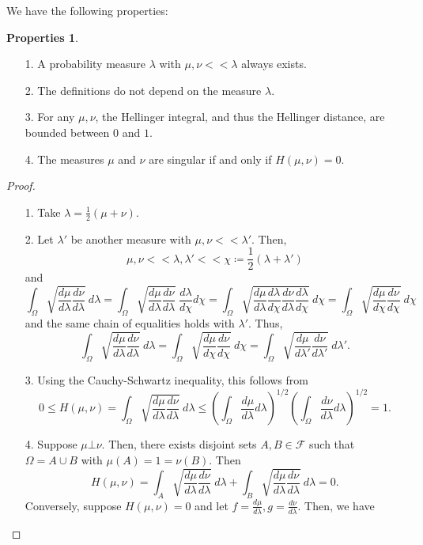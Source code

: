 \documentclass[10pt, a4paper]{report}
\theoremstyle{definition}
\newtheorem*{properties*}{Properties}
\theoremstyle{remark}
\begin{document}
We have the following properties:
\begin{properties*}
	\begin{itemize}
		\item[] 
		\item[1.] A probability measure $\lambda$ with $\mu,\nu << \lambda$ always exists.
		\item[2.] The definitions do not depend on the measure $\lambda$. 
		\item[3.] For any $\mu,\nu$, the Hellinger integral, and thus the Hellinger distance, are bounded between $0$ and $1$.
		\item[4.] The measures $\mu$ and $\nu$ are singular if and only if $H(\mu,\nu)=0$. 
		
	\end{itemize}
	\begin{proof}
		\begin{itemize}
			\item[1.] Take $\lambda = \frac{1}{2}(\mu + \nu)$.
			\item[2.] Let $\lambda'$ be another measure with $\mu,\nu << \lambda'$. Then,
			$$\mu,\nu << \lambda,\lambda' << \chi \coloneqq \frac{1}{2}(\lambda+\lambda')$$
			and 
			$$\int_{\Omega} \sqrt{\frac{d\mu}{d\lambda}\frac{d\nu}{d\lambda}}\ d\lambda = \int_{\Omega} \sqrt{\frac{d\mu}{d\lambda}\frac{d\nu}{d\lambda}}\ \frac{d\lambda}{d\chi} d\chi = \int_{\Omega} \sqrt{\frac{d\mu}{d\lambda}\frac{d\lambda}{d\chi}\frac{d\nu}{d\lambda}\frac{d\lambda}{d\chi}}\  d\chi = \int_{\Omega} \sqrt{\frac{d\mu}{d\chi}\frac{d\nu}{d\chi}}\ d\chi$$
			and the same chain of equalities holds with $\lambda'$. Thus,
			$$\int_{\Omega} \sqrt{\frac{d\mu}{d\lambda}\frac{d\nu}{d\lambda}}\ d\lambda = \int_{\Omega} \sqrt{\frac{d\mu}{d\chi}\frac{d\nu}{d\chi}}\ d\chi = \int_{\Omega} \sqrt{\frac{d\mu}{d\lambda'}\frac{d\nu}{d\lambda'}}\ d\lambda'.$$
			\item[3.] Using the Cauchy-Schwartz inequality, this follows from 
			$$0 \leq H(\mu,\nu) = \int_{\Omega} \sqrt{\frac{d\mu}{d\lambda}\frac{d\nu}{d\lambda}}\ d\lambda \leq \left(\int_{\Omega} \frac{d\mu}{d\lambda}d\lambda\right)^{1/2} \left(\int_{\Omega} \frac{d\nu}{d\lambda}d\lambda\right)^{1/2} = 1.$$
			\item[4.] Suppose $\mu \bot \nu$. Then, there exists disjoint sets $A,B \in \mathcal{F}$ such that $\Omega=A\cup B$ with $\mu(A)=1=\nu(B)$. Then
			$$H(\mu,\nu) = \int_{A} \sqrt{\frac{d\mu}{d\lambda}\frac{d\nu}{d\lambda}}\ d\lambda + \int_{B} \sqrt{\frac{d\mu}{d\lambda}\frac{d\nu}{d\lambda}}\ d\lambda = 0.$$
			Conversely, suppose $H(\mu,\nu)=0$ and let $f=\frac{d\mu}{d\lambda},g=\frac{d\nu}{d\lambda}$. Then, we have 

\end{itemize}
\end{proof}
\end{properties*}
\end{document}

